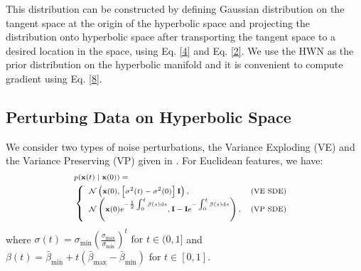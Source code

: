 \documentclass[letterpaper]{article} %
\begin{document}

This distribution can be constructed by defining Gaussian distribution on the tangent space at the origin of the hyperbolic space and projecting the distribution onto hyperbolic space after transporting the tangent space to a desired location in the space, using Eq. \eqref{4} and Eq. \eqref{2}. We use the HWN as the prior distribution on the hyperbolic manifold and it is convenient to compute gradient using Eq. \eqref{8}.

% 
\subsection{Perturbing Data on Hyperbolic Space}
We consider two types of noise perturbations, the Variance Exploding (VE) and the Variance Preserving (VP) given in \cite{song2020score}. For Euclidean features, we have:  
\begin{equation}\label{9}
\begin{scriptsize}{
\begin{aligned}
&p(\mathbf{x}(t) \mid \mathbf{x}(0))=\\ &\left\{\begin{array}{ll}
\mathcal{N}\left(\mathbf{x}(0),\left[\sigma^{2}(t)-\sigma^{2}(0)\right] \mathbf{I}\right), & \text {(VE SDE) } \\
\mathcal{N}\left(\mathbf{x}(0)e^{-\frac{1}{2} \int_{0}^{t} \beta(s) \mathrm{d} s} , \mathbf{I}-\mathbf{I} e^{-\int_{0}^{t} \beta(s) \mathrm{d} s}\right), & (\text{VP SDE)} \\
\end{array}\right.
\end{aligned}
}\end{scriptsize}
\end{equation}
%
where $\sigma(t)=\sigma_{\min }\left(\frac{\sigma_{\max }}{\sigma_{\min }}\right)^{t} \text { for } t \in(0,1]$ and $\beta(t)=\bar{\beta}_{\min }+t\left(\bar{\beta}_{\max }-\bar{\beta}_{\min }\right) \text { for } t \in[0,1]$.
\end{document}
